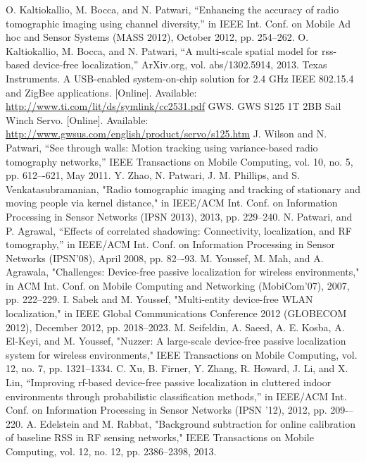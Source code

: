 \documentclass[conference]{IEEEtran}
\begin{document}
\begin{thebibliography}{49}
 O. Kaltiokallio, M. Bocca, and N. Patwari, “Enhancing the accuracy of radio tomographic imaging using channel diversity,” in IEEE Int. Conf. on Mobile Ad hoc and Sensor Systems (MASS 2012), October 2012, pp. 254--262.
 O. Kaltiokallio, M. Bocca, and N. Patwari, “A multi-scale spatial model for rss-based device-free localization,” ArXiv.org, vol. abs/1302.5914, 2013.
 Texas Instruments. A USB-enabled system-on-chip solution for 2.4 GHz IEEE 802.15.4 and ZigBee applications. [Online]. Available: \url{http://www.ti.com/lit/ds/symlink/cc2531.pdf}
 GWS. GWS S125 1T 2BB Sail Winch Servo. [Online]. Available: \url{http://www.gwsus.com/english/product/servo/s125.htm}
 J. Wilson and N. Patwari, “See through walls: Motion tracking using variance-based radio tomography networks,” IEEE Transactions on Mobile Computing, vol. 10, no. 5, pp. 612–-621, May 2011.
 Y. Zhao, N. Patwari, J. M. Phillips, and S. Venkatasubramanian, "Radio tomographic imaging and tracking of stationary and moving people via kernel distance," in IEEE/ACM Int. Conf. on Information Processing in Sensor Networks (IPSN 2013), 2013, pp. 229--240.
 N. Patwari, and P. Agrawal, “Effects of correlated shadowing: Connectivity, localization, and RF tomography,” in IEEE/ACM Int. Conf. on Information Processing in Sensor Networks (IPSN’08), April 2008, pp. 82–-93.
 M. Youssef, M. Mah, and A. Agrawala, "Challenges: Device-free passive localization for wireless environments," in ACM Int. Conf. on Mobile Computing and Networking (MobiCom'07), 2007, pp. 222--229.
 I. Sabek and M. Youssef, "Multi-entity device-free WLAN localization," in IEEE Global Communications Conference 2012 (GLOBECOM 2012), December 2012, pp. 2018--2023.
 M. Seifeldin, A. Saeed, A. E. Kosba, A. El-Keyi, and M. Youssef, "Nuzzer: A large-scale device-free passive localization system for wireless environments," IEEE Transactions on Mobile Computing, vol. 12, no. 7, pp. 1321--1334.
 C. Xu, B. Firner, Y. Zhang, R. Howard, J. Li, and X. Lin, “Improving rf-based device-free passive localization in cluttered indoor environments through probabilistic classification methods,” in IEEE/ACM Int. Conf. on Information Processing in Sensor Networks (IPSN ’12), 2012, pp. 209-–220.
 A. Edelstein and M. Rabbat, "Background subtraction for online calibration of baseline RSS in RF sensing networks," IEEE Transactions on Mobile Computing, vol. 12, no. 12, pp. 2386--2398, 2013.

\end{thebibliography}
\end{document}
